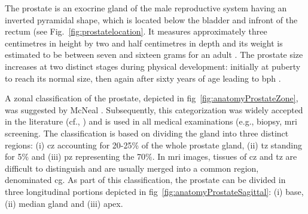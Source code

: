 The prostate is an exocrine gland of the male reproductive system having an inverted pyramidal shape, which is located below the bladder and infront of the rectum (see Fig.~\ref{fig:prostatelocation}.
It measures approximately three centimetres in height by two and half centimetres in depth and its weight is estimated to be between seven and sixteen grams for an adult \cite{Leissner1979}.
The prostate size increases at two distinct stages during physical development: initially at puberty to reach its normal size, then again after sixty years of age leading to \ac{bph} \cite{Parfait2010}.

A zonal classification of the prostate, depicted in \acs{fig}~\ref{fig:anatomyProstateZone}, was suggested by McNeal \cite{McNeal1981}.
Subsequently, this categorization was widely accepted in the literature (cf., \cite{Hricak1987,Villers1991,Coakley2000,Parfait2010}) and is used in all medical examinations (e.g., biopsy, \ac{mri} screening.
The classification is based on dividing the gland into three distinct regions: (i) \ac{cz} accounting for 20-25\% of the whole prostate gland, (ii) \ac{tz} standing for 5\% and (iii) \ac{pz} representing the 70\%.
In \ac{mri} images, tissues of \ac{cz} and \ac{tz} are difficult to distinguish and are usually merged into a common region, denominated \ac{cg}.
As part of this classification, the prostate can be divided in three longitudinal portions depicted in \acs{fig}~\ref{fig:anatomyProstateSagittal}: (i) base, (ii) median gland and (iii) apex.





